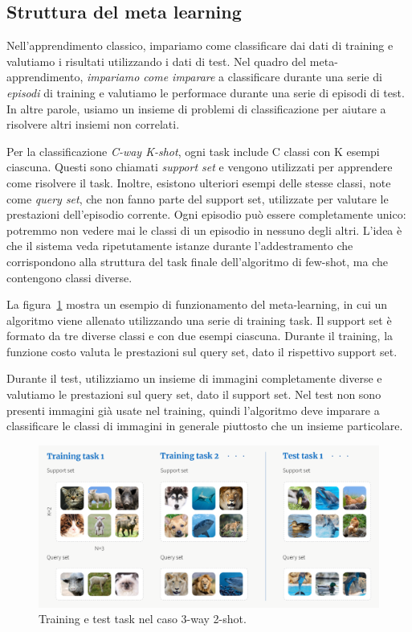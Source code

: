 \documentclass[12pt,a4paper,titlepage]{article}
\begin{document}
\subsection{Struttura del meta learning}
Nell'apprendimento classico, impariamo come classificare dai dati di training e valutiamo i risultati utilizzando i dati di test. Nel quadro del meta-apprendimento, \textit{impariamo come imparare} a classificare durante una serie di \textit{episodi} di training e valutiamo le performace durante una serie di episodi di test. In altre parole, usiamo un insieme di problemi di classificazione per aiutare a risolvere altri insiemi non correlati.

Per la classificazione \textit{C-way K-shot}, ogni task include C classi con K esempi ciascuna. Questi sono chiamati \textit{support set} e vengono utilizzati per apprendere come risolvere il task. Inoltre, esistono ulteriori esempi delle stesse classi, note come \textit{query set}, che non fanno parte del support set, utilizzate per valutare le prestazioni dell'episodio corrente. Ogni episodio può essere completamente unico: potremmo non vedere mai le classi di un episodio in nessuno degli altri. L'idea è che il sistema veda ripetutamente istanze durante l'addestramento che corrispondono alla struttura del task finale dell'algoritmo di few-shot, ma che contengono classi diverse.

La figura~\ref{fig:few_shot} mostra un esempio di funzionamento del meta-learning, in cui un algoritmo viene allenato utilizzando una serie di training task. Il support set è formato da tre diverse classi e con due esempi ciascuna. Durante il training, la funzione costo valuta le prestazioni sul query set, dato il rispettivo support set. 

Durante il test, utilizziamo un insieme di immagini completamente diverse e valutiamo le prestazioni sul query set, dato il support set. Nel test non sono presenti immagini già usate nel training, quindi l'algoritmo deve imparare a classificare le classi di immagini in generale piuttosto che un insieme particolare.

\begin{figure}[h]
	\centering	
	\includegraphics[width=1\textwidth]{Immagini/training_task}
	\caption{Training e test task nel caso 3-way 2-shot.}
	\label{fig:few_shot}
\end{figure}
\end{document}
